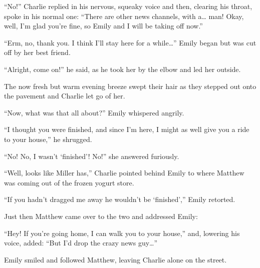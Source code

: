 “No!” Charlie replied in his nervous, squeaky voice and then, clearing his throat, spoke in his normal one: “There are other news channels, with a… man! Okay, well, I’m glad you’re fine, so Emily and I will be taking off now.”

“Erm, no, thank you. I think I’ll stay here for a while…” Emily began but was cut off by her best friend.

“Alright, come on!” he said, as he took her by the elbow and led her outside.

The now fresh but warm evening breeze swept their hair as they stepped out onto the pavement and Charlie let go of her.

“Now, what was that all about?” Emily whispered angrily.

“I thought you were finished, and since I'm here, I might as well give you a ride to your house,” he shrugged.

“No! No, I wasn’t ‘finished’! No!” she answered furiously.

“Well, looks like Miller has,” Charlie pointed behind Emily to where Matthew was coming out of the frozen yogurt store.

“If you hadn’t dragged me away he wouldn’t be ‘finished’,” Emily retorted.

Just then Matthew came over to the two and addressed Emily:

“Hey! If you’re going home, I can walk you to your house,” and, lowering his voice, added: “But I’d drop the crazy news guy…”

Emily smiled and followed Matthew, leaving Charlie alone on the street.